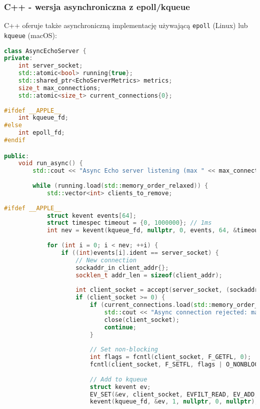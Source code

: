 \subsubsection{C++ - wersja asynchroniczna z epoll/kqueue}
C++ oferuje także asynchroniczną implementację używającą \texttt{epoll} (Linux) lub \texttt{kqueue} \mbox{(macOS)}:
\begin{lstlisting}[language=C++, caption={Async Echo Serwer w C++ z event loop}, label={lst:cpp_async_echo_server}]
class AsyncEchoServer {
private:
    int server_socket;
    std::atomic<bool> running{true};
    std::shared_ptr<EchoServerMetrics> metrics;
    size_t max_connections;
    std::atomic<size_t> current_connections{0};
    
#ifdef __APPLE__
    int kqueue_fd;
#else
    int epoll_fd;
#endif

public:
    void run_async() {
        std::cout << "Async Echo server listening (max " << max_connections << " connections)\n";
        
        while (running.load(std::memory_order_relaxed)) {
            std::vector<int> clients_to_remove;
            
#ifdef __APPLE__
            struct kevent events[64];
            struct timespec timeout = {0, 1000000}; // 1ms
            int nev = kevent(kqueue_fd, nullptr, 0, events, 64, &timeout);
            
            for (int i = 0; i < nev; ++i) {
                if ((int)events[i].ident == server_socket) {
                    // New connection
                    sockaddr_in client_addr{};
                    socklen_t addr_len = sizeof(client_addr);
                    
                    int client_socket = accept(server_socket, (sockaddr*)&client_addr, &addr_len);
                    if (client_socket >= 0) {
                        if (current_connections.load(std::memory_order_relaxed) >= max_connections) {
                            std::cout << "Async connection rejected: max capacity reached\n";
                            close(client_socket);
                            continue;
                        }
                        
                        // Set non-blocking
                        int flags = fcntl(client_socket, F_GETFL, 0);
                        fcntl(client_socket, F_SETFL, flags | O_NONBLOCK);
                        
                        // Add to kqueue
                        struct kevent ev;
                        EV_SET(&ev, client_socket, EVFILT_READ, EV_ADD, 0, 0, nullptr);
                        kevent(kqueue_fd, &ev, 1, nullptr, 0, nullptr);
                        

\end{lstlisting}
